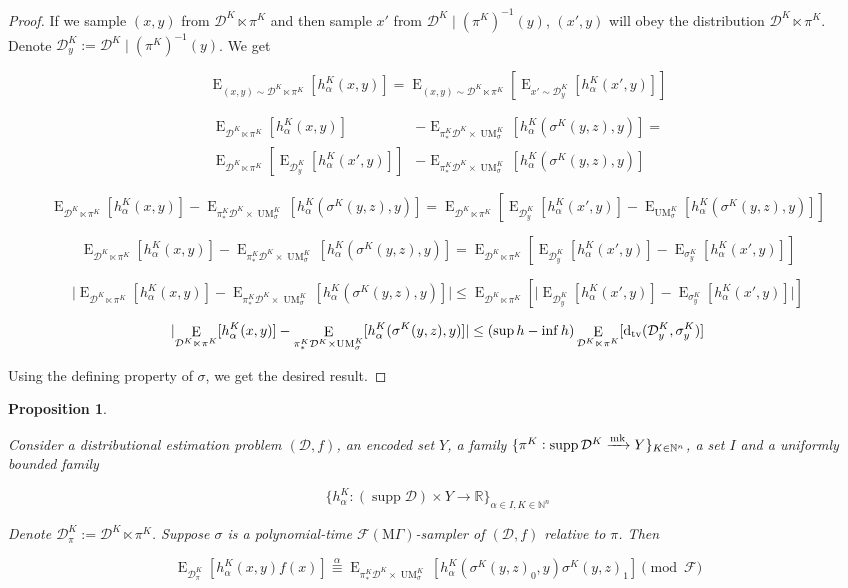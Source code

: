 \documentclass[11pt]{article}
\numberwithin{equation}{section}
\theoremstyle{definition}
\theoremstyle{plain}
\newtheorem{proposition}{Proposition}[section]
\DeclareMathOperator{\Supp}{supp}
\DeclareMathOperator{\E}{E}
\DeclareMathOperator{\UM}{UM}
\newcommand{\Dtv}{\operatorname{d}_{\textnormal{tv}}}
\newcommand{\Nats}{\mathbb{N}}
\newcommand{\Reals}{\mathbb{R}}
\newcommand{\Abs}[1]{\lvert #1 \rvert}
\newcommand{\Dist}{\mathcal{D}}
\newcommand{\MGrow}{\mathrm{M}\Gamma}
\newcommand{\Fall}{\mathcal{F}}
\newcommand{\EMG}{\Fall(\MGrow)}
\newcommand{\Markov}{\xrightarrow{\textnormal{mk}}}
\begin{document}
\begin{proof}

If we sample $(x,y)$ from $\Dist^{K} \ltimes \pi^K$ and then sample $x'$ from ${\Dist^{K} \mid (\pi^K)^{-1}(y)}$, $(x',y)$ will obey the distribution $\Dist^{K} \ltimes \pi^K$. Denote $\Dist_y^K:=\Dist^{K} \mid (\pi^K)^{-1}(y)$. We get

$$\E_{(x,y) \sim \Dist^{K} \ltimes \pi^K}[h_\alpha^K(x,y)] = \E_{(x,y) \sim \Dist^{K} \ltimes \pi^K}[\E_{x' \sim \Dist_y^K}[h_\alpha^K(x',y)]]$$

\begin{align*}
\E_{\Dist^{K} \ltimes \pi^K}[h_\alpha^K(x,y)] &- \E_{\pi_*^K\Dist^{K} \times \UM_\sigma^K}[h_\alpha^K(\sigma^K(y,z),y)] =\\ 
\E_{\Dist^{K} \ltimes \pi^K}[\E_{\Dist_y^K}[h_\alpha^K(x',y)]] &- \E_{\pi_*^K\Dist^{K} \times \UM_\sigma^K}[h_\alpha^K(\sigma^K(y,z),y)]
\end{align*}

$$\E_{\Dist^{K} \ltimes \pi^K}[h_\alpha^K(x,y)] - \E_{\pi_*^K\Dist^{K} \times \UM_\sigma^K}[h_\alpha^K(\sigma^K(y,z),y)] = \E_{\Dist^{K} \ltimes \pi^K}[\E_{\Dist_y^K}[h_\alpha^K(x',y)]-\E_{\UM_\sigma^K}[h_\alpha^K(\sigma^K(y,z),y)]]$$

$$\E_{\Dist^{K} \ltimes \pi^K}[h_\alpha^K(x,y)] - \E_{\pi_*^K\Dist^{K} \times \UM_\sigma^K}[h_\alpha^K(\sigma^K(y,z),y)] = \E_{\Dist^{K} \ltimes \pi^K}[\E_{\Dist_y^K}[h_\alpha^K(x',y)]-\E_{\sigma_y^K}[h_\alpha^K(x',y)]]$$

$$\Abs{\E_{\Dist^{K} \ltimes \pi^K}[h_\alpha^K(x,y)] - \E_{\pi_*^K\Dist^{K} \times \UM_\sigma^K}[h_\alpha^K(\sigma^K(y,z),y)]} \leq \E_{\Dist^{K} \ltimes \pi^K}[\Abs{\E_{\Dist_y^K}[h_\alpha^K(x',y)]-\E_{\sigma_y^K}[h_\alpha^K(x',y)]}]$$

$$\Abs{\E_{\Dist^{K} \ltimes \pi^K}[h_\alpha^K(x,y)] - \E_{\pi_*^K\Dist^{K} \times \UM_\sigma^K}[h_\alpha^K(\sigma^K(y,z),y)]} \leq (\sup h - \inf h) \E_{\Dist^{K} \ltimes \pi^K}[\Dtv(\Dist_y^K,\sigma_y^K)]$$

Using the defining property of $\sigma$, we get the desired result.
\end{proof}

\begin{proposition}
\label{prp:gen}

Consider a distributional estimation problem $(\Dist,f)$, an encoded set $Y$, a family ${\{\pi^K: \Supp \Dist^{K} \Markov Y\}_{K \in \Nats^n}}$, a set ${I}$ and a uniformly bounded family

\[\{h_\alpha^K: (\Supp \Dist) \times Y \rightarrow \Reals\}_{\alpha \in I, K \in \Nats^n}\]

Denote $\Dist_\pi^K:=\Dist^{K} \ltimes \pi^K$. Suppose $\sigma$ is a polynomial-time $\EMG$-sampler of $(\Dist,f)$ relative to $\pi$. Then

\begin{equation}
\E_{\Dist_\pi^K}[h_\alpha^K(x,y)f(x)] \overset{\alpha}{\equiv} \E_{\pi_*^K\Dist^{K} \times \UM_\sigma^K}[h_\alpha^K(\sigma^K(y,z)_0,y)\sigma^K(y,z)_1] \pmod \Fall
\end{equation}

\end{proposition}
\end{document}

